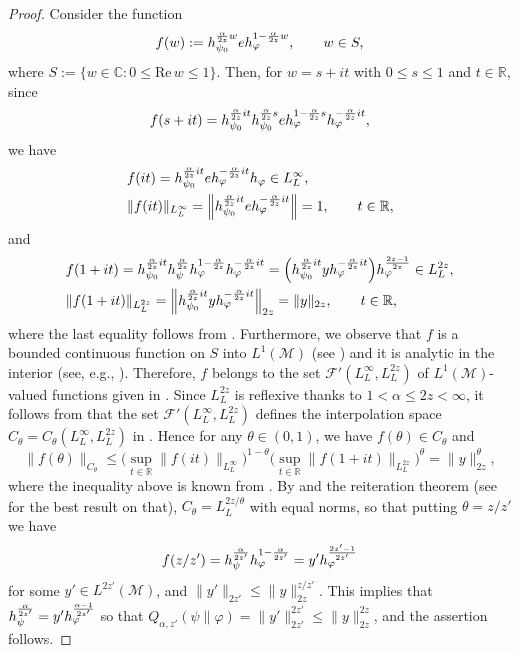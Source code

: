 \documentclass[12pt]{article}
\theoremstyle{definition}
\theoremstyle{remark}
\numberwithin{equation}{section}
\def\Me{\mathcal M}
\def\cF{\mathcal{F}}
\def\ffi{\varphi}
\def\bR{\mathbb{R}}
\def\bC{\mathbb{C}}
\def\Re{\mathrm{Re}\,}
\begin{document}
\begin{proof}
Consider the function
\begin{align}\label{F-6.15}
f(w):=h_{\psi_0}^{{\alpha\over2z}w}eh_\ffi^{1-{\alpha\over2z}w},\qquad w\in S,
\end{align}
where $S:=\{w\in\bC:0\le\Re w\le1\}$. Then, for $w=s+it$ with $0\le s\le1$ and $t\in\bR$, since
\[
f(s+it)=h_{\psi_0}^{{\alpha\over2z}it}h_{\psi_0}^{{\alpha\over2z}s}e
h_\ffi^{1-{\alpha\over2z}s}h_\ffi^{-{\alpha\over2z}it},
\]
{we have
\begin{align*}
&f(it)=h_{\psi_0}^{{\alpha\over2z}it}eh_\ffi^{-{\alpha\over2z}it}h_\ffi\in L^\infty_L, \\
&\|f(it)\|_{L^\infty_L}=\Big\|h_{\psi_0}^{{\alpha\over2z}it}eh_\ffi^{-{\alpha\over2z}it}\Big\|=1,
\qquad t\in\bR,
\end{align*}
and
\begin{align*}
&f(1+it)=h_{\psi_0}^{{\alpha\over2z}it}h_\psi^{\alpha\over2z}
h_\ffi^{1-{\alpha\over2z}}h_\ffi^{-{\alpha\over2z}it}
=\Bigl(h_{\psi_0}^{{\alpha\over2z}it}yh_\ffi^{-{\alpha\over2z}it}\Bigr)h_\ffi^{2z-1\over2z}\in L^{2z}_L, \\
&\|f(1+it)\|_{L^{2z}_L}=\Big\|h_{\psi_0}^{{\alpha\over2z}it}yh_\ffi^{-{\alpha\over2z}it}\Big\|_{2z}=\|y\|_{2z},
\qquad t\in\bR,
\end{align*}
where the last equality follows from \cite[Lemma 10.1]{kosaki1984applications}. Furthermore,
we observe that $f$ is a bounded continuous function on $S$ into $L^1(\Me)$
(see \cite[Lemma 10.2]{kosaki1984applications}) and it is analytic in the interior
(see, e.g., \cite[Lemma 9.19 and Theorem 9.18(c)]{hiai2021lectures}).} Therefore, $f$ belongs to the
set $\cF'(L^\infty_L,L^{2z}_L)$ of $L^1(\Me)$-valued functions given in
\cite[Definition 1.4]{kosaki1984applications}. Since $L^{2z}_L$ is reflexive thanks to $1<\alpha\le2z<\infty$,
it follows from \cite[Theorems 1.5 and Remark 3.4]{kosaki1984applications} that the set
$\cF'(L^\infty_L,L^{2z}_L)$ defines the interpolation space $C_\theta=C_\theta(L^\infty_L,L^{2z}_L)$ in
\cite[Definition 1.1]{kosaki1984applications}. Hence for any $\theta\in(0,1)$, we have $f(\theta)\in C_\theta$
and
\[
\|f(\theta)\|_{C_\theta}\le\biggl(\sup_{t\in\bR}\|f(it)\|_{L^\infty_L}\biggr)^{1-\theta}
\biggl(\sup_{t\in\bR}\|f(1+it)\|_{L^{2z}_L}\biggr)^\theta=\|y\|_{2z}^\theta,
\]
where the inequality above is known from \cite[Lemma 4.3.2(ii)]{bergh1976interpolation}. By
\cite[Theorem 1.9]{kosaki1984applications} and the reiteration theorem (see
\cite{cwikel1978complex} {for the best result on that}), $C_\theta=L^{2z/\theta}_L$
with equal norms, so that putting $\theta=z/z'$ we have
\[
f(z/z')=h_\psi^{\alpha\over2z'}h_\ffi^{1-{\alpha\over2z'}}=y'h_\ffi^{2z'-1\over2z'}
\]
for some $y'\in L^{2z'}(\Me)$, and $\|y'\|_{2z'}\le\|y\|_{2z}^{z/z'}$. This implies that
$h_\psi^{\alpha\over2z'}=y'h_\ffi^{\alpha-1\over2z'}$ so that
$Q_{\alpha,z'}(\psi\|\ffi)=\|y'\|_{2z'}^{2z'}\le\|y\|_{2z}^{2z}$, and the assertion follows.
\end{proof}
\end{document}
